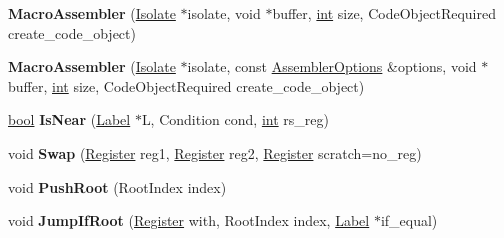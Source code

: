 \begin{DoxyCompactItemize}
\item 
\mbox{\label{classv8_1_1internal_1_1MacroAssembler_ace8e2b09ca4bac1b40d12d84416284f9}} 
{\bfseries Macro\+Assembler} (\mbox{\hyperlink{classv8_1_1internal_1_1Isolate}{Isolate}} $\ast$isolate, void $\ast$buffer, \mbox{\hyperlink{classint}{int}} size, Code\+Object\+Required create\+\_\+code\+\_\+object)
\item 
\mbox{\label{classv8_1_1internal_1_1MacroAssembler_a118ab3d38490e9a50ee0157274ac3dc9}} 
{\bfseries Macro\+Assembler} (\mbox{\hyperlink{classv8_1_1internal_1_1Isolate}{Isolate}} $\ast$isolate, const \mbox{\hyperlink{structv8_1_1internal_1_1AssemblerOptions}{Assembler\+Options}} \&options, void $\ast$buffer, \mbox{\hyperlink{classint}{int}} size, Code\+Object\+Required create\+\_\+code\+\_\+object)
\item 
\mbox{\label{classv8_1_1internal_1_1MacroAssembler_a10a8f8cb9d2b62abe29059698fb2a1b7}} 
\mbox{\hyperlink{classbool}{bool}} {\bfseries Is\+Near} (\mbox{\hyperlink{classv8_1_1internal_1_1Label}{Label}} $\ast$L, Condition cond, \mbox{\hyperlink{classint}{int}} rs\+\_\+reg)
\item 
\mbox{\label{classv8_1_1internal_1_1MacroAssembler_a184747cf20b5bc305a3e344e349aaa90}} 
void {\bfseries Swap} (\mbox{\hyperlink{classv8_1_1internal_1_1Register}{Register}} reg1, \mbox{\hyperlink{classv8_1_1internal_1_1Register}{Register}} reg2, \mbox{\hyperlink{classv8_1_1internal_1_1Register}{Register}} scratch=no\+\_\+reg)
\item 
\mbox{\label{classv8_1_1internal_1_1MacroAssembler_a91239e2f90525c993ce4dacef2b8219c}} 
void {\bfseries Push\+Root} (Root\+Index index)
\item 
\mbox{\label{classv8_1_1internal_1_1MacroAssembler_a026e7752dc80a8ac2c86242c713de128}} 
void {\bfseries Jump\+If\+Root} (\mbox{\hyperlink{classv8_1_1internal_1_1Register}{Register}} with, Root\+Index index, \mbox{\hyperlink{classv8_1_1internal_1_1Label}{Label}} $\ast$if\+\_\+equal)
\item 
\mbox{\label{classv8_1_1internal_1_1MacroAssembler_a2c433ea6b27ac33ad2b6ef6b1a751eb9}} 

\end{DoxyCompactItemize}
